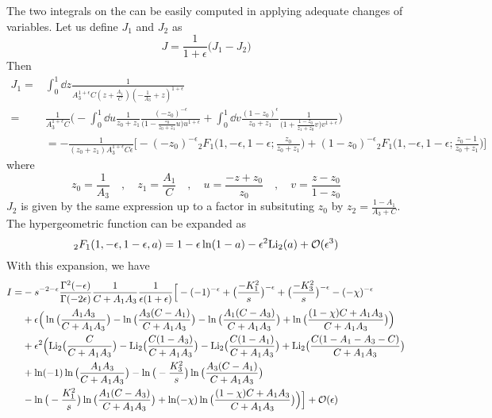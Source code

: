 The two integrals on the \rhs can be easily computed in applying adequate changes of variables.
Let us define $J_1$ and $J_2$ as
\begin{equation}
J = \frac{1}{1+\epsilon}\big(J_1-J_2\big)
\end{equation}
Then
\begin{equation}
\begin{split}
J_1 = & \int^1_0 \dd z \frac{1}{A_3^{1+\epsilon}C(z + \frac{A_1}{C})(-\frac{1}{A_3} + z)^{1+\epsilon}} 
\\
= &
\frac{1}{A_3^{1+\epsilon}C}\Big(
-\int^1_0 \dd u \frac{1}{z_0 + z_1}\frac{(-z_0)^{-\epsilon}}{\big(1-\frac{z_0}{z_0 + z_1}u\big) u^{1+\epsilon}} +
\int^1_0\dd v \frac{(1-z_0)^{\epsilon}}{z_0 + z_1}\frac{1}{\big(1+ \frac{1-z_0}{z_1 + z_0}v\big)v^{1+\epsilon}}\Big)
\\
& = 
-\frac{1}{(z_0 + z_1 )A_3^{1+\epsilon}C\epsilon}
\Big[-(-z_0)^{-\epsilon}{}_2F_1\big(1,-\epsilon, 1-\epsilon; \frac{z_0}{z_0 + z_1}\big)
+ (1-z_0)^{-\epsilon}{}_2F_1\big(1, -\epsilon, 1-\epsilon; \frac{z_0 -1}{z_0 + z_1}\big)\Big]
\end{split}
\end{equation}
where
\begin{equation}
z_0 = \frac{1}{A_3} \quad, \quad z_1 = \frac{A_1}{C}
\quad,\quad
u=\frac{-z + z_0}{z_0}\quad,\quad
v=\frac{z-z_0}{1-z_0}
\end{equation}
$J_2$ is given by the same expression up to a factor in subsituting $z_0$ by $z_2 = \frac{1 - A_1}{A_3 + C}$. 
\\
The hypergeometric function can be expanded as
\begin{equation}
{}_2F_1 (1,-\epsilon, 1-\epsilon, a) = 
1-\epsilon\ln(1-a) - \epsilon^2 \mathrm{Li}_2 (a) + \mathcal{O}(\epsilon^3)
\end{equation}
\iffalse
With this expansion, we have
\begin{equation}
\begin{split}
I  = &
-s^{-2-\epsilon}\frac{\Gamma^2(-\epsilon)}{\Gamma(-2\epsilon)}
\frac{1}{C+A_1A_3}\frac{1}{\epsilon(1+\epsilon)}\Big[
-(-1)^{-\epsilon} + \big(\frac{-K_1^2}{s}\big)^{-\epsilon} + \big(\frac{-K_3^2}{s}\big)^{-\epsilon} - (-\chi)^{-\epsilon}
\\
&+
\epsilon\Big(\ln\big(\frac{A_1A_3}{C+A_1A_3}\big) - \ln\big(\frac{A_3(C-A_1 )}{C+A_1A_3}\big) - \ln\big(\frac{A_1(C-A_3)}{C+A_1A_3}\big) +
\ln\big(\frac{(1-\chi)C + A_1A_3}{C+A_1A_3}\big) 
\Big)
\\
& +\epsilon^2\Big(
\mathrm{Li}_2\big(\frac{C}{C+A_1A_3}\big) - \mathrm{Li}_2\big(\frac{C(1-A_3)}{C+A_1A_3}\big) - \mathrm{Li}_2\big(\frac{C(1-A_1)}{C+A_1A_3}\big)+\mathrm{Li}_2\big(\frac{C(1-A_1-A_3-C)}{C+A_1A_3}\big)
\\
& +\ln(-1)\ln\big(\frac{A_1A_3}{C+A_1A_3}\big)
-\ln\big(-\frac{K_3^2}{s}\big)\ln\big(\frac{A_3(C-A_1)}{C+A_1A_3}\big)
\\
&
-\ln\big(-\frac{K_1^2}{s}\big)\ln\big(\frac{A_1(C-A_3)}{C+A_1A_3}\big)
+\ln(-\chi)\ln\big(\frac{(1-\chi)C + A_1A_3}{C+A_1A_3}\big)
\Big)
\Big]
+\mathcal{O}(\epsilon)
\end{split}
\end{equation}
